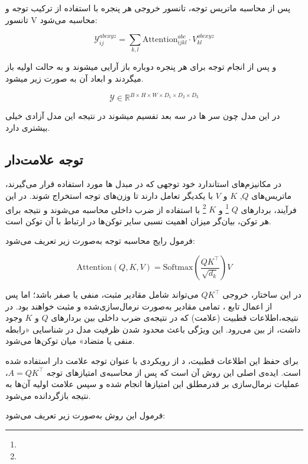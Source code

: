 پس از محاسبه ماتریس توجه، تانسور خروجی هر پنجره با استفاده از ترکیب توجه و تانسور V محاسبه می‌شود:

\begin{equation}
	\mathcal{Y}_{ij}^{abcxyz} = \sum_{k,l} \text{Attention}_{ijkl}^{abc} \cdot V_{kl}^{abcxyz}
\end{equation}


و پس از انجام توجه برای هر پنجره دوباره باز آرایی میشوند و به حالت اولیه باز میگردند و ابعاد آن به صورت زیر میشود.

\[
\mathcal{Y} \in \mathbb{R}^{B \times H \times W \times D_1 \times D_2 \times D_3}
\]

در این مدل چون سر ها در سه بعد تفسیم میشوند در نتیجه این مدل آزادی خیلی بیشتری دارد.






\subsection{توجه علامت‌دار}

در مکانیزم‌های استاندارد خود توجهی که در مبدل ها مورد استفاده قرار می‌گیرند، ماتریس‌های $Q$, $K$ و $V$ با یکدیگر تعامل دارند تا وزن‌های توجه استخراج شوند. در این فرآیند، بردارهای $Q$  \footnote{}
 و $K$ 
 \footnote{}
  با استفاده از ضرب داخلی محاسبه می‌شوند و نتیجه برای هر توکن، بیان‌گر میزان اهمیت نسبی سایر توکن‌ها در ارتباط با آن توکن است.

فرمول رایج محاسبه توجه به‌صورت زیر تعریف می‌شود:

\begin{equation}
	\text{Attention}(Q, K, V) = \text{Softmax}\left( \frac{QK^\top}{\sqrt{d_k}} \right) V
\end{equation}

در این ساختار، خروجی $QK^\top$ می‌تواند شامل مقادیر مثبت، منفی یا صفر باشد؛ اما پس از اعمال تابع ، تمامی مقادیر به‌صورت نرمال‌سازی‌شده و مثبت خواهند بود. در نتیجه،اطلاعات قطبیت (علامت) که در نتیجه‌ی ضرب داخلی بین بردارهای $Q$ و $K$ وجود داشت، از بین می‌رود. این ویژگی باعث محدود شدن ظرفیت مدل در شناسایی «رابطه منفی یا متضاد» میان توکن‌ها می‌شود.

برای حفظ این اطلاعات قطبیت، د از رویکردی با عنوان  توجه علامت دار استفاده شده است. ایده‌ی اصلی این روش آن است که پس از محاسبه‌ی امتیازهای توجه $A = QK^\top$، عملیات نرمال‌سازی  بر قدرمطلق این امتیازها انجام شده و سپس علامت اولیه آن‌ها به نتیجه بازگردانده می‌شود.

فرمول این روش به‌صورت زیر تعریف می‌شود:

